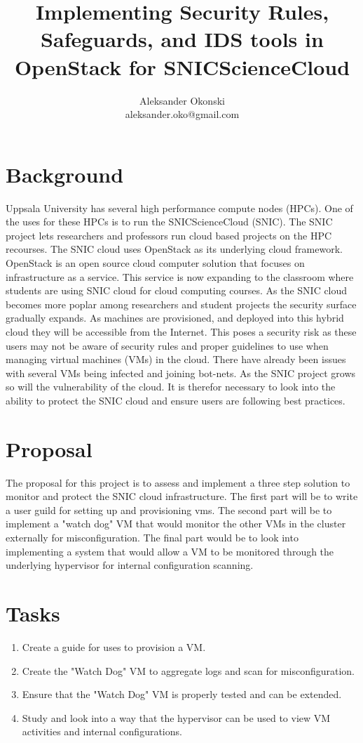 \documentclass[12pt]{article}
\title{Implementing Security Rules, Safeguards, and IDS tools in OpenStack for SNICScienceCloud}
\author{Aleksander Okonski \\ aleksander.oko@gmail.com}
\date{}
\begin{document}
\maketitle

\section{Background}
Uppsala University has several high performance compute nodes (HPCs). One of the uses for these HPCs is to run the SNICScienceCloud (SNIC). The SNIC project lets researchers and professors run cloud based projects on the HPC recourses. The SNIC cloud uses OpenStack as its underlying cloud framework. OpenStack is an open source cloud computer solution that focuses on infrastructure as a service.  This service is now expanding to the classroom where students are using SNIC cloud for cloud computing courses. As the SNIC cloud becomes more poplar among researchers and student projects the security surface gradually expands. As machines are provisioned, and deployed into this hybrid cloud they will be accessible from the Internet.  This poses a security risk as these users may not be aware of security rules and proper guidelines to use when managing virtual machines (VMs) in the cloud. There have already been issues with several VMs being infected and joining bot-nets. As the SNIC project grows so will the vulnerability of the cloud. It is therefor necessary to look into the ability to protect the SNIC cloud and ensure users are following best practices.

\section{Proposal}
The proposal for this project is to assess and implement a three step solution to monitor and protect the SNIC cloud infrastructure. The first part will be to write a user guild for setting up and provisioning vms. The second part will be to implement a "watch dog" VM that would monitor the other VMs in the cluster externally for misconfiguration. The final part would be to look into implementing a system that would allow a VM to be monitored through the underlying hypervisor for internal configuration scanning.

\section{Tasks}

\begin{enumerate}
    \item Create a guide for uses to provision a VM.
    \item Create the "Watch Dog" VM to aggregate logs and scan for misconfiguration.
    \item Ensure that the "Watch Dog" VM is properly tested and can be extended.
    \item Study and look into a way that the hypervisor can be used to view VM activities and internal configurations.
\end{enumerate}
\end{document}
